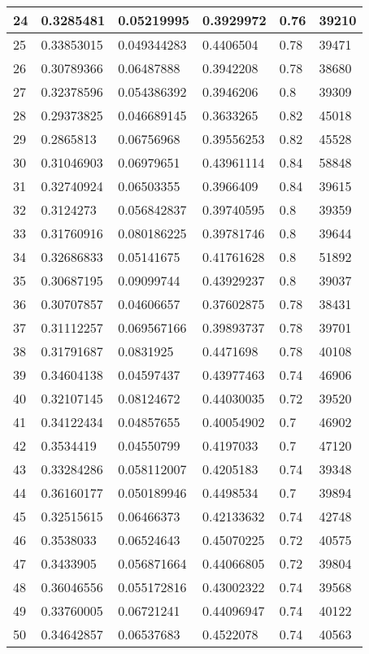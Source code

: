 \begin{longtable}{|l|l|l|l|l|l|}
24 & 0.3285481 & 0.05219995 & 0.3929972 & 0.76 & 39210 \\ \hline 
25 & 0.33853015 & 0.049344283 & 0.4406504 & 0.78 & 39471 \\ \hline 
26 & 0.30789366 & 0.06487888 & 0.3942208 & 0.78 & 38680 \\ \hline 
27 & 0.32378596 & 0.054386392 & 0.3946206 & 0.8 & 39309 \\ \hline 
28 & 0.29373825 & 0.046689145 & 0.3633265 & 0.82 & 45018 \\ \hline 
29 & 0.2865813 & 0.06756968 & 0.39556253 & 0.82 & 45528 \\ \hline 
30 & 0.31046903 & 0.06979651 & 0.43961114 & 0.84 & 58848 \\ \hline 
31 & 0.32740924 & 0.06503355 & 0.3966409 & 0.84 & 39615 \\ \hline 
32 & 0.3124273 & 0.056842837 & 0.39740595 & 0.8 & 39359 \\ \hline 
33 & 0.31760916 & 0.080186225 & 0.39781746 & 0.8 & 39644 \\ \hline 
34 & 0.32686833 & 0.05141675 & 0.41761628 & 0.8 & 51892 \\ \hline 
35 & 0.30687195 & 0.09099744 & 0.43929237 & 0.8 & 39037 \\ \hline 
36 & 0.30707857 & 0.04606657 & 0.37602875 & 0.78 & 38431 \\ \hline 
37 & 0.31112257 & 0.069567166 & 0.39893737 & 0.78 & 39701 \\ \hline 
38 & 0.31791687 & 0.0831925 & 0.4471698 & 0.78 & 40108 \\ \hline 
39 & 0.34604138 & 0.04597437 & 0.43977463 & 0.74 & 46906 \\ \hline 
40 & 0.32107145 & 0.08124672 & 0.44030035 & 0.72 & 39520 \\ \hline 
41 & 0.34122434 & 0.04857655 & 0.40054902 & 0.7 & 46902 \\ \hline 
42 & 0.3534419 & 0.04550799 & 0.4197033 & 0.7 & 47120 \\ \hline 
43 & 0.33284286 & 0.058112007 & 0.4205183 & 0.74 & 39348 \\ \hline 
44 & 0.36160177 & 0.050189946 & 0.4498534 & 0.7 & 39894 \\ \hline 
45 & 0.32515615 & 0.06466373 & 0.42133632 & 0.74 & 42748 \\ \hline 
46 & 0.3538033 & 0.06524643 & 0.45070225 & 0.72 & 40575 \\ \hline 
47 & 0.3433905 & 0.056871664 & 0.44066805 & 0.72 & 39804 \\ \hline 
48 & 0.36046556 & 0.055172816 & 0.43002322 & 0.74 & 39568 \\ \hline 
49 & 0.33760005 & 0.06721241 & 0.44096947 & 0.74 & 40122 \\ \hline 
50 & 0.34642857 & 0.06537683 & 0.4522078 & 0.74 & 40563 \\ \hline 
\end{longtable}